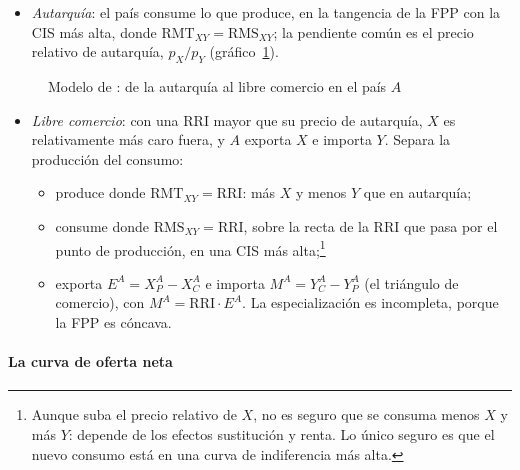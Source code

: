 \documentclass[11pt]{article}
\begin{document}
\begin{itemize}
\item \emph{Autarquía}: el país consume lo que produce, en la tangencia de la FPP con la CIS más alta, donde $\mathrm{RMT}_{XY}=\mathrm{RMS}_{XY}$; la pendiente común es el precio relativo de autarquía, $p_X/p_Y$ (gráfico~\ref{fig:anexo-haberler}).
\end{itemize}
\begin{figure}[H]
\centering
\caption{Modelo de : de la autarquía al libre comercio en el país $A$}\label{fig:anexo-haberler}
\end{figure}
\begin{itemize}
\item \emph{Libre comercio}: con una RRI mayor que su precio de autarquía, $X$ es relativamente más caro fuera, y $A$ exporta $X$ e importa $Y$. Separa la producción del consumo:
  \begin{itemize}
  \item produce donde $\mathrm{RMT}_{XY}=\mathrm{RRI}$: más $X$ y menos $Y$ que en autarquía;
  \item consume donde $\mathrm{RMS}_{XY}=\mathrm{RRI}$, sobre la recta de la RRI que pasa por el punto de producción, en una CIS más alta;\footnote{Aunque suba el precio relativo de $X$, no es seguro que se consuma menos $X$ y más $Y$: depende de los efectos sustitución y renta. Lo único seguro es que el nuevo consumo está en una curva de indiferencia más alta.}
  \item exporta $E^A=X^A_P-X^A_C$ e importa $M^A=Y^A_C-Y^A_P$ (el triángulo de comercio), con $M^A=\mathrm{RRI}\cdot E^A$. La especialización es incompleta, porque la FPP es cóncava.
  \end{itemize}
\end{itemize}

\paragraph{La curva de oferta neta}
\end{document}
